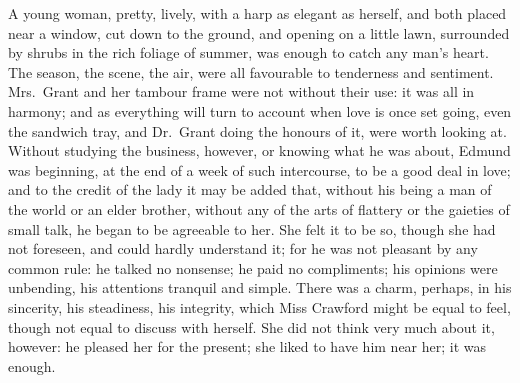 A young woman, pretty, lively, with a harp as
elegant as herself, and both placed near a window,
cut down to the ground, and opening on a little lawn,
surrounded by shrubs in the rich foliage of summer,
was enough to catch any man's heart.  The season, the scene,
the air, were all favourable to tenderness and sentiment.
Mrs.\ Grant and her tambour frame were not without their use:
it was all in harmony; and as everything will turn to account
when love is once set going, even the sandwich tray,
and Dr.\ Grant doing the honours of it, were worth looking at.
Without studying the business, however, or knowing
what he was about, Edmund was beginning, at the end
of a week of such intercourse, to be a good deal in love;
and to the credit of the lady it may be added that,
without his being a man of the world or an elder brother,
without any of the arts of flattery or the gaieties of
small talk, he began to be agreeable to her.  She felt it
to be so, though she had not foreseen, and could hardly
understand it; for he was not pleasant by any common rule:
he talked no nonsense; he paid no compliments; his opinions
were unbending, his attentions tranquil and simple.
There was a charm, perhaps, in his sincerity, his steadiness,
his integrity, which Miss Crawford might be equal
to feel, though not equal to discuss with herself.
She did not think very much about it, however:  he pleased
her for the present; she liked to have him near her;
it was enough.

